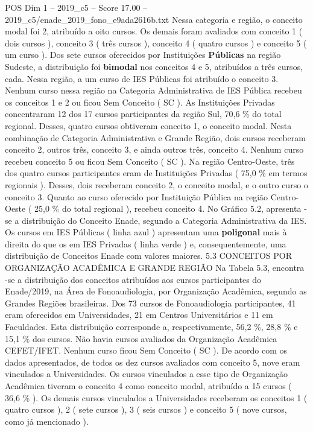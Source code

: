 \begin{textsample}{POS Dim 1 – 2019\_c5 – Score 17.00 – 2019\_c5/enade\_2019\_fono\_e9ada2616b.txt}
Nessa categoria e região, o conceito modal foi 2, atribuído a oito cursos.
Os demais foram avaliados com conceito 1 ( dois cursos ), conceito 3 ( três cursos ), conceito 4 ( quatro cursos ) e conceito 5 ( um curso ).
Dos sete cursos oferecidos por Instituições \textbf{Públicas} na região Sudeste, a distribuição foi \textbf{bimodal} nos conceitos 4 e 5, atribuídos a três cursos, cada.
Nessa região, a um curso de IES Públicas foi atribuído o conceito 3.
Nenhum curso nessa região na Categoria Administrativa de IES Pública recebeu os conceitos 1 e 2 ou ficou Sem Conceito ( SC ).
As Instituições Privadas concentraram 12 dos 17 cursos participantes da região Sul, 70,6 \% do total regional.
Desses, quatro cursos obtiveram conceito 1, o conceito modal.
Nesta combinação de Categoria Administrativa e Grande Região, dois cursos receberam conceito 2, outros três, conceito 3, e ainda outros três, conceito 4.
Nenhum curso recebeu conceito 5 ou ficou Sem Conceito ( SC ).
Na região Centro-Oeste, três dos quatro cursos participantes eram de Instituições Privadas ( 75,0 \% em termos regionais ).
Desses, dois receberam conceito 2, o conceito modal, e o outro curso o conceito 3.
Quanto ao curso oferecido por Instituição Pública na região Centro-Oeste ( 25,0 \% do total regional ), recebeu conceito 4.
No Gráfico 5.2, apresenta -se a distribuição do Conceito Enade, segundo a Categoria Administrativa da IES.
Os cursos em IES Públicas ( linha azul ) apresentam uma \textbf{poligonal} mais à direita do que os em IES Privadas ( linha verde ) e, consequentemente, uma distribuição de Conceitos Enade com valores maiores. 5.3 CONCEITOS POR ORGANIZAÇÃO ACADÊMICA E GRANDE REGIÃO Na Tabela 5.3, encontra -se a distribuição dos conceitos atribuídos aos cursos participantes do Enade/2019, na Área de Fonoaudiologia, por Organização Acadêmica, segundo as Grandes Regiões brasileiras.
Dos 73 cursos de Fonoaudiologia participantes, 41 eram oferecidos em Universidades, 21 em Centros Universitários e 11 em Faculdades.
Esta distribuição corresponde a, respectivamente, 56,2 \%, 28,8 \% e 15,1 \% dos cursos.
Não havia cursos avaliados da Organização Acadêmica CEFET/IFET.
Nenhum curso ficou Sem Conceito ( SC ).
De acordo com os dados apresentados, de todos os dez cursos avaliados com conceito 5, nove eram vinculados a Universidades.
Os cursos vinculados a esse tipo de Organização Acadêmica tiveram o conceito 4 como conceito modal, atribuído a 15 cursos ( 36,6 \% ).
Os demais cursos vinculados a Universidades receberam os conceitos 1 ( quatro cursos ), 2 ( sete cursos ), 3 ( seis cursos ) e conceito 5 ( nove cursos, como já mencionado ).

\end{textsample}
